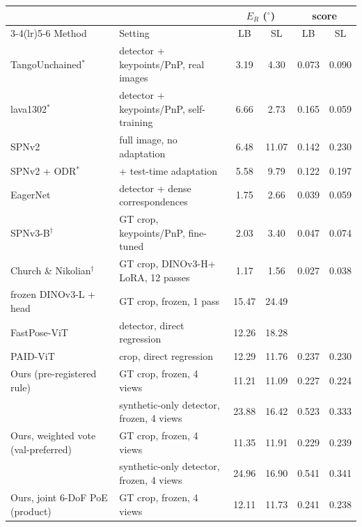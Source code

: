 \begin{tabular}{@{}l l cc cc@{}}
\toprule
 & & \multicolumn{2}{c}{$E_R$ ($^\circ$)} & \multicolumn{2}{c}{score} \\
\cmidrule(lr){3-4}\cmidrule(lr){5-6} Method & Setting & LB & SL & LB & SL \\
\midrule
TangoUnchained$^*$~\cite{park2023spec} & detector + keypoints/PnP, real images & 3.19 & 4.30 & 0.073 & 0.090 \\
lava1302$^*$~\cite{park2023spec} & detector + keypoints/PnP, self-training & 6.66 & 2.73 & 0.165 & 0.059 \\
SPNv2~\cite{park2024spnv2} & full image, no adaptation & 6.48 & 11.07 & 0.142 & 0.230 \\
SPNv2 + ODR$^*$~\cite{park2024spnv2} & + test-time adaptation & 5.58 & 9.79 & 0.122 & 0.197 \\
EagerNet~\cite{ulmer2023eagernet} & detector + dense correspondences & 1.75 & 2.66 & 0.039 & 0.059 \\
SPNv3-B$^\dagger$~\cite{park2026spnv3} & GT crop, keypoints/PnP, fine-tuned & 2.03 & 3.40 & 0.047 & 0.074 \\
Church \& Nikolian$^\dagger$~\cite{church2026vfm} & GT crop, DINOv3-H+ LoRA, 12 passes & 1.17 & 1.56 & 0.027 & 0.038 \\
\quad frozen DINOv3-L + head~\cite{church2026vfm} & GT crop, frozen, 1 pass & 15.47 & 24.49 &  &  \\
FastPose-ViT~\cite{ancey2026fastpose} & detector, direct regression & 12.26 & 18.28 &  &  \\
PAID-ViT~\cite{xie2026paidvit} & crop, direct regression & 12.29 & 11.76 & 0.237 & 0.230 \\
\midrule
Ours (pre-registered rule) & GT crop, frozen, 4 views & 11.21 & 11.09 & 0.227 & 0.224 \\
 & synthetic-only detector, frozen, 4 views & 23.88 & 16.42 & 0.523 & 0.333 \\
Ours, weighted vote (val-preferred) & GT crop, frozen, 4 views & 11.35 & 11.91 & 0.229 & 0.239 \\
 & synthetic-only detector, frozen, 4 views & 24.96 & 16.90 & 0.541 & 0.341 \\
Ours, joint 6-DoF PoE (product) & GT crop, frozen, 4 views & 12.11 & 11.73 & 0.241 & 0.238 \\
\bottomrule
\end{tabular}
